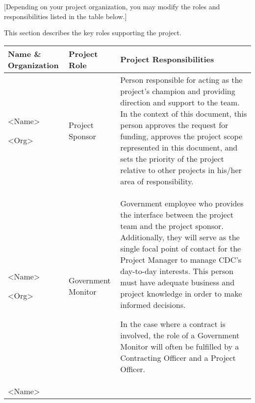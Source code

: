 {[}Depending on your project organization, you may modify the roles and
responsibilities listed in the table below.{]}

This section describes the key roles supporting the project.

\begin{longtable}[]{@{}lll@{}}
\toprule
\textbf{Name \& Organization} & \textbf{Project Role} & \textbf{Project
Responsibilities}\tabularnewline
\midrule
\endhead
\begin{minipage}[t]{0.30\columnwidth}\raggedright
\textless{}Name\textgreater{}

\textless{}Org\textgreater{}\strut
\end{minipage} & \begin{minipage}[t]{0.30\columnwidth}\raggedright
Project Sponsor\strut
\end{minipage} & \begin{minipage}[t]{0.30\columnwidth}\raggedright
Person responsible for acting as the project's champion and providing
direction and support to the team. In the context of this document, this
person approves the request for funding, approves the project scope
represented in this document, and sets the priority of the project
relative to other projects in his/her area of responsibility.\strut
\end{minipage}\tabularnewline
\begin{minipage}[t]{0.30\columnwidth}\raggedright
\textless{}Name\textgreater{}

\textless{}Org\textgreater{}\strut
\end{minipage} & \begin{minipage}[t]{0.30\columnwidth}\raggedright
Government Monitor\strut
\end{minipage} & \begin{minipage}[t]{0.30\columnwidth}\raggedright
Government employee who provides the interface between the project team
and the project sponsor. Additionally, they will serve as the single
focal point of contact for the Project Manager to manage CDC's
day-to-day interests. This person must have adequate business and
project knowledge in order to make informed decisions.

In the case where a contract is involved, the role of a Government
Monitor will often be fulfilled by a Contracting Officer and a Project
Officer.\strut
\end{minipage}\tabularnewline
\begin{minipage}[t]{0.30\columnwidth}\raggedright
\textless{}Name\textgreater{}


\end{minipage}
\end{longtable}
